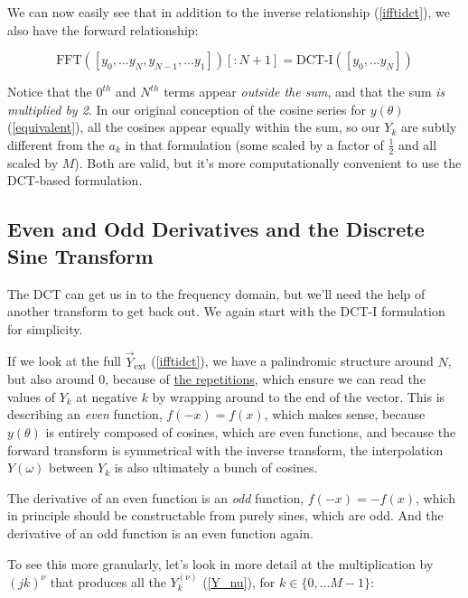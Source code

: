 \documentclass[10pt]{article}
\begin{document}
We can now easily see that in addition to the inverse relationship (\autoref{ifftidct}), we also have the forward relationship:\vspace{-2mm}

$$\text{FFT}([y_0, ... y_N, y_{N-1}, ... y_1])[:\!N+1] = \text{DCT-I}([y_0, ... y_N])$$

Notice that the $0^{th}$ and $N^{th}$ terms appear \textit{outside the sum}, and that the sum \textit{is multiplied by 2}. In our original conception of the cosine series for $y(\theta)$ (\autoref{equivalent}), all the cosines appear equally within the sum, so our $Y_k$ are subtly different from the $a_k$ in that formulation (some scaled by a factor of $\frac{1}{2}$ and all scaled by $M$). Both are valid, but it's more computationally convenient to use the DCT-based formulation.

\subsection{Even and Odd Derivatives and the Discrete Sine Transform}\label{evenodd}

The DCT can get us in to the frequency domain, but we'll need the help of another transform to get back out. We again start with the DCT-I formulation for simplicity.

If we look at the full $\vec{Y}_{\text{ext}}$ (\autoref{ifftidct}), we have a palindromic structure around $N$, but also around $0$, because of \href{https://dsp.stackexchange.com/a/18931/40873}{the repetitions}\cite{bristow}, which ensure we can read the values of $Y_k$ at negative $k$ by wrapping around to the end of the vector. This is describing an \textit{even} function, $f(-x) = f(x)$, which makes sense, because $y(\theta)$ is entirely composed of cosines, which are even functions, and because the forward transform is symmetrical with the inverse transform, the interpolation $Y(\omega)$ between $Y_k$ is also ultimately a bunch of cosines.

The derivative of an even function is an \textit{odd} function, $f(-x) = -f(x)$, which in principle should be constructable from purely sines, which are odd. And the derivative of an odd function is an even function again.

To see this more granularly, let's look in more detail at the multiplication by $(jk)^\nu$ that produces all the $Y_k^{(\nu)}$ (\autoref{Y_nu}), for $k \in \{0, ... M-1\}$:\vspace{-3mm}
\end{document}
